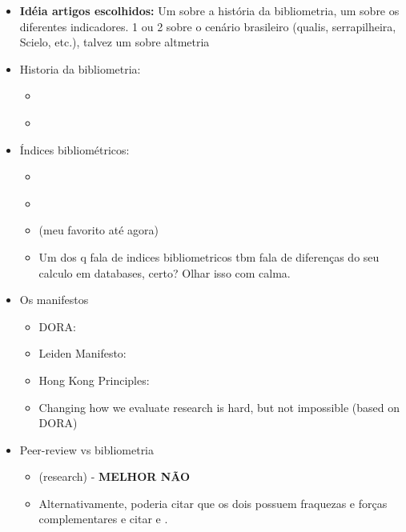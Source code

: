 \documentclass[11pt]{article}
\begin{document}
\begin{itemize}
\item \textbf{Idéia artigos escolhidos:} Um sobre a história da bibliometria, um sobre os diferentes indicadores. 1 ou 2 sobre o cenário brasileiro (qualis, serrapilheira, Scielo, etc.), talvez um sobre altmetria

\item Historia da bibliometria:
\begin{itemize}
\item \cite{araujo2006}
\item \cite{thompson2015}
\end{itemize}
\item Índices bibliométricos:
\begin{itemize}
\item \cite{garner2018}
\item \cite{durieux2010}
\item \cite{roldan-valadez2019} (meu favorito até agora)
\item Um dos q fala de indices bibliometricos tbm fala de diferenças do seu calculo em databases, certo? Olhar isso com calma.
\end{itemize}
\item Os manifestos
\begin{itemize}
\item DORA: \cite{cagan2013}
\item Leiden Manifesto: \cite{hicks2015}
\item Hong Kong Principles: \cite{moher2020}
\item Changing how we evaluate research is hard, but not impossible (based on DORA)  \cite{hatch2020}
\end{itemize}

\item Peer-review vs bibliometria
\begin{itemize}
\item \cite{besselaar2020} (research) - \textbf{MELHOR NÃO}
\item Alternativamente, poderia citar que os dois possuem fraquezas e forças complementares e citar \cite{besselaar2020} e \cite{haeffner-cavaillon2009a}.
\end{itemize}


\end{itemize}
\end{document}
